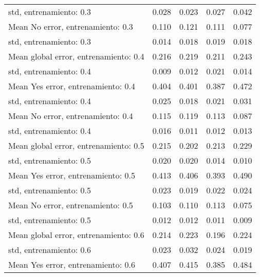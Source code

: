 \begin{longtable}{p{4cm}|p{1.5cm}|p{1.5cm}|p{1.5cm}|p{1.5cm}}
std, entrenamiento: 0.3               & 0.028 &        0.023 &     0.027 &                        0.042 \\
Mean No error, entrenamiento: 0.3     & 0.110 &        0.121 &     0.111 &                        0.077 \\
std, entrenamiento: 0.3               & 0.014 &        0.018 &     0.019 &                        0.018 \\
Mean global error, entrenamiento: 0.4 & 0.216 &        0.219 &     0.211 &                        0.243 \\
std, entrenamiento: 0.4               & 0.009 &        0.012 &     0.021 &                        0.014 \\
Mean Yes error, entrenamiento: 0.4    & 0.404 &        0.401 &     0.387 &                        0.472 \\
std, entrenamiento: 0.4               & 0.025 &        0.018 &     0.021 &                        0.031 \\
Mean No error, entrenamiento: 0.4     & 0.115 &        0.119 &     0.113 &                        0.087 \\
std, entrenamiento: 0.4               & 0.016 &        0.011 &     0.012 &                        0.013 \\
Mean global error, entrenamiento: 0.5 & 0.215 &        0.202 &     0.213 &                        0.229 \\
std, entrenamiento: 0.5               & 0.020 &        0.020 &     0.014 &                        0.010 \\
Mean Yes error, entrenamiento: 0.5    & 0.413 &        0.406 &     0.393 &                        0.490 \\
std, entrenamiento: 0.5               & 0.023 &        0.019 &     0.022 &                        0.024 \\
Mean No error, entrenamiento: 0.5     & 0.103 &        0.110 &     0.113 &                        0.075 \\
std, entrenamiento: 0.5               & 0.012 &        0.012 &     0.011 &                        0.009 \\
Mean global error, entrenamiento: 0.6 & 0.214 &        0.223 &     0.196 &                        0.224 \\
std, entrenamiento: 0.6               & 0.023 &        0.032 &     0.024 &                        0.019 \\
Mean Yes error, entrenamiento: 0.6    & 0.407 &        0.415 &     0.385 &                        0.484 \\

\end{longtable}
